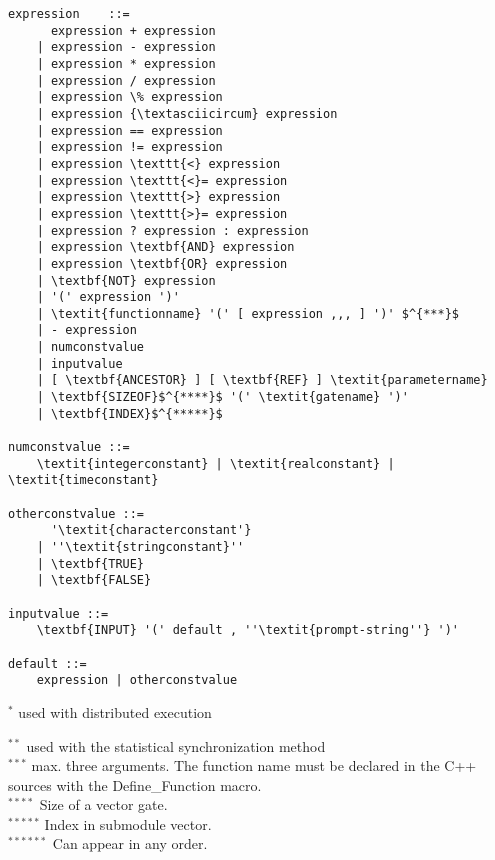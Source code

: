 \begin{Verbatim}[commandchars=\\\{\}]
expression    ::=
      expression + expression
    | expression - expression
    | expression * expression
    | expression / expression
    | expression \% expression
    | expression {\textasciicircum} expression
    | expression == expression
    | expression != expression
    | expression \texttt{<} expression
    | expression \texttt{<}= expression
    | expression \texttt{>} expression
    | expression \texttt{>}= expression
    | expression ? expression : expression
    | expression \textbf{AND} expression
    | expression \textbf{OR} expression
    | \textbf{NOT} expression
    | '(' expression ')'
    | \textit{functionname} '(' [ expression ,,, ] ')' $^{***}$
    | - expression
    | numconstvalue
    | inputvalue
    | [ \textbf{ANCESTOR} ] [ \textbf{REF} ] \textit{parametername}
    | \textbf{SIZEOF}$^{****}$ '(' \textit{gatename} ')'
    | \textbf{INDEX}$^{*****}$

numconstvalue ::=
    \textit{integerconstant} | \textit{realconstant} | \textit{timeconstant}

otherconstvalue ::=
      '\textit{characterconstant'}
    | ''\textit{stringconstant}''
    | \textbf{TRUE}
    | \textbf{FALSE}

inputvalue ::=
    \textbf{INPUT} '(' default , ''\textit{prompt-string''} ')'

default ::=
    expression | otherconstvalue
\end{Verbatim}


$^{*}$ used with distributed execution


$^{**}$ used with the statistical synchronization method\\
$^{***}$ max. three arguments. The function name must be declared
in the C++ sources with the Define\_Function macro.\\
$^{****}$ Size of a vector gate.\\
$^{*****}$ Index in submodule vector.\\
$^{******}$ Can appear in any order.



